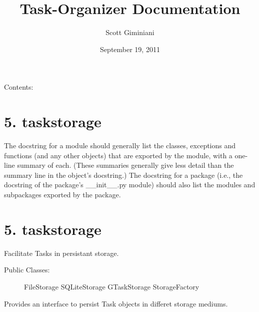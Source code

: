 \documentclass[letterpaper,10pt,english]{sphinxmanual}
\title{Task-Organizer Documentation}
\date{September 19, 2011}
\author{Scott Giminiani}
\begin{document}
\maketitle
\tableofcontents
{}\label{index::doc}


Contents:


\chapter{5. taskstorage}
\label{index:module-cliparser}\label{index:welcome-to-task-organizer-s-documentation}\label{index:taskstorage}
The docstring for a module should generally list the classes, exceptions and functions (and any other objects) that are exported by the module, with a one-line summary of each. (These summaries generally give less detail than the summary line in the object's docstring.) The docstring for a package (i.e., the docstring of the package's \_\_init\_\_.py module) should also list the modules and subpackages exported by the package.


\chapter{5. taskstorage}
\label{index:id1}\label{index:module-storage}
Facilitate Tasks in persistant storage.
\begin{description}
\item[{Public Classes:}] \leavevmode
FileStorage
SQLiteStorage
GTaskStorage
StorageFactory

\end{description}

Provides an interface to persist Task objects in differet storage mediums.

\end{document}
